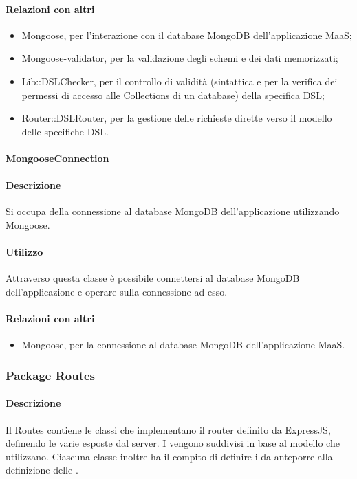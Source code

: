 \paragraph*{Relazioni con altri }
\begin{itemize}
\item Mongoose, per l'interazione con il database MongoDB dell'applicazione MaaS;
\item Mongoose-validator, per la validazione degli schemi e dei dati memorizzati;
\item Lib::DSLChecker, per il controllo di validità (sintattica e per la verifica dei permessi di accesso alle Collections di un database) della specifica DSL;
\item Router::DSLRouter, per la gestione delle richieste dirette verso il modello delle specifiche DSL.
\end{itemize}

\paragraph{MongooseConnection}
\paragraph*{Descrizione}

Si occupa della connessione al database MongoDB dell'applicazione utilizzando Mongoose.

\paragraph*{Utilizzo}
Attraverso questa classe è possibile connettersi al database MongoDB dell'applicazione e operare sulla connessione ad esso.

\paragraph*{Relazioni con altri }
\begin{itemize}
\item Mongoose, per la connessione al database MongoDB dell'applicazione MaaS.
\end{itemize}

\subsubsection{Package Routes}
\paragraph*{Descrizione}
Il  Routes contiene le classi che implementano il router definito da ExpressJS, definendo le varie  esposte dal server.
I  vengono suddivisi in base al modello che utilizzano. 
Ciascuna classe inoltre ha il compito di definire i  da anteporre alla definizione delle .\\

